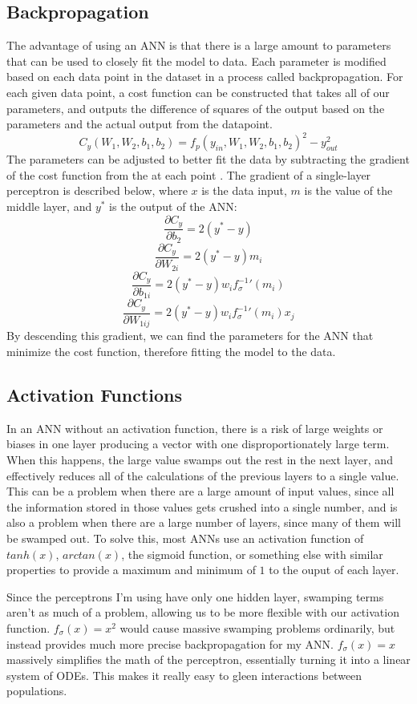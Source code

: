 \documentclass{article}
\begin{document}
\subsection{Backpropagation}
The advantage of using an ANN is that there is a large amount to parameters that can be used to closely fit the model to data. Each parameter is modified based on each data point in the dataset in a process called backpropagation. For each given data point, a cost function can be constructed that takes all of our parameters, and outputs the difference of squares of the output based on the parameters and the actual output from the datapoint.
$$C_y(W_1, W_2, b_1, b_2)=f_p(y_{in}, W_1, W_2, b_1, b_2)^2-y_{out}^2$$
The parameters can be adjusted to better fit the data by subtracting the gradient of the cost function from the at each point \cite{backproppaper}. The gradient of a single-layer perceptron is described below, where $x$ is the data input, $m$ is the value of the middle layer, and $y^*$ is the output of the ANN:
$$\frac{\partial C_y}{\partial b_2}=2(y^*-y)$$
$$\frac{\partial C_y}{\partial W_{2i}}=2(y^*-y)m_i$$
$$\frac{\partial C_y}{\partial b_{1i}}=2(y^*-y)w_if_\sigma^{-1}'(m_i)$$
$$\frac{\partial C_y}{\partial W_{1ij}}=2(y^*-y)w_if_\sigma^{-1}'(m_i)x_j$$
By descending this gradient, we can find the parameters for the ANN that minimize the cost function, therefore fitting the model to the data.

\subsection{Activation Functions}
In an ANN without an activation function, there is a risk of large weights or biases in one layer producing a vector with one disproportionately large term. When this happens, the large value swamps out the rest in the next layer, and effectively reduces all of the calculations of the previous layers to a single value. This can be a problem when there are a large amount of input values, since all the information stored in those values gets crushed into a single number, and is also a problem when there are a large number of layers, since many of them will be swamped out. To solve this, most ANNs use an activation function of $tanh(x)$, $arctan(x)$, the sigmoid function, or something else with similar properties to provide a maximum and minimum of $1$ to the ouput of each layer.

Since the perceptrons I'm using have only one hidden layer, swamping terms aren't as much of a problem, allowing us to be more flexible with our activation function. $f_\sigma(x)=x^2$ would cause massive swamping problems ordinarily, but instead provides much more precise backpropagation for my ANN. $f_\sigma(x)=x$ massively simplifies the math of the perceptron, essentially turning it into a linear system of ODEs. This makes it really easy to gleen interactions between populations.
\end{document}
